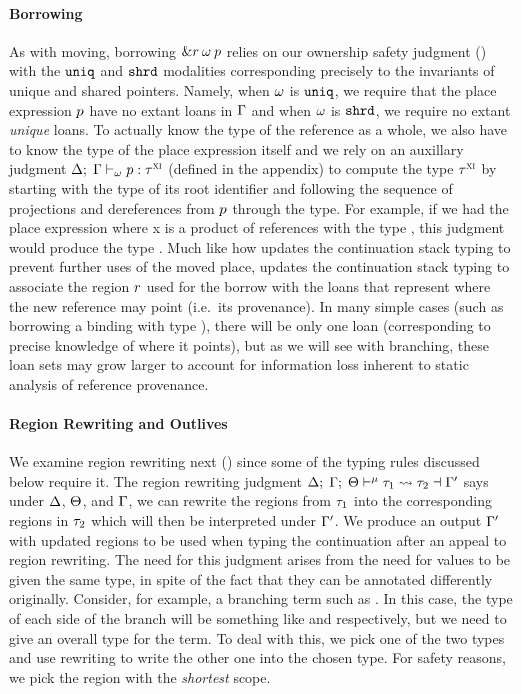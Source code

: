 \paragraph{Borrowing} As with moving, borrowing
$\&r \: \omega \: p$ relies on our ownership safety
judgment () with the $\mathtt{uniq}$ and $\mathtt{shrd}$ modalities
corresponding precisely to the invariants of unique and shared pointers. Namely,
when $\omega$ is $\mathtt{uniq}$, we require that the place expression $p$
have no extant loans in $\Gamma$ and when $\omega$ is $\mathtt{shrd}$, we require
no extant \emph{unique} loans. To actually know the type of the reference as a
whole, we also have to know the type of the place expression itself and we rely
on an auxillary judgment
$ \Delta; \; \Gamma \vdash_{\omega} p : \tau^\textsc{xi} $
(defined in the appendix) to compute the type $\tau^\textsc{xi}$ by starting with the
type of its root identifier and following the sequence of projections and
dereferences from $p$ through the type. For example, if we had the
place expression  where x is a product of references with the type
, this judgment would produce the type . Much
like how  updates the continuation stack typing to prevent
further uses of the moved place,  updates the continuation
stack typing to associate the region $r$ used for the borrow with the
loans that represent where the new reference may point (i.e.\ its provenance).
In many simple cases (such as borrowing a binding  with type
), there will be only one loan (corresponding to precise knowledge of
where it points), but as we will see with branching, these loan sets may grow
larger to account for information loss inherent to static analysis of reference
provenance.

\paragraph{Region Rewriting and Outlives} We examine region rewriting next
() since some of the typing rules discussed below require
it. The region rewriting judgment
$\Delta; \; \Gamma; \; \Theta \vdash^{\mu} \tau_1 \leadsto \tau_2 \dashv \Gamma^\prime$
says under $\Delta$, $\Theta$, and $\Gamma$, we can rewrite the
regions from $\tau_1$ into the corresponding regions in $\tau_2$ which
will then be interpreted under $\Gamma^\prime$. We produce an output
$\Gamma^\prime$ with updated regions to be used when typing the continuation
after an appeal to region rewriting. The need for this judgment arises from the
need for values to be given the same type, in spite of the fact that they can be
annotated differently originally. Consider, for example, a branching term such
as . In this case, the type of
each side of the branch will be something like  and
 respectively, but we need to give an overall type for the
term. To deal with this, we pick one of the two types and use rewriting to write
the other one into the chosen type. For safety reasons, we pick the region with
the \emph{shortest} scope.

